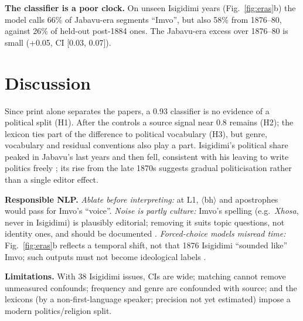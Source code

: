 \documentclass[10pt,letterpaper]{article}
\newcommand{\grapheme}[1]{$\langle$#1$\rangle$}
\begin{document}
 \textbf{The classifier is a poor clock.} On unseen Isigidimi years (Fig.~\ref{fig:eras}b) the model calls 66\% of Jabavu-era segments ``Imvo'', but also 58\% from 1876--80, against 26\% of held-out post-1884 ones. The Jabavu-era excess over 1876--80 is small (+0.05, CI [0.03, 0.07]).


\section{Discussion}\label{Discussion}
Since print alone separates the papers, a 0.93 classifier is no evidence of a political split (H1). After the controls a source signal near 0.8 remains (H2); the lexicon ties part of the difference to political vocabulary (H3), but genre, vocabulary and residual conventions also play a part. Isigidimi's political share peaked in Jabavu's last years and then fell, consistent with his leaving to write politics freely \citep{odendaal1984vukani}; its rise from the late 1870s suggests gradual politicisation rather than a single editor effect.

 \textbf{Responsible NLP.} \emph{Ablate before interpreting:} at L1, \grapheme{bh} and apostrophes would pass for Imvo's ``voice''. \emph{Noise is partly culture:} Imvo's spelling (e.g.\ \emph{Xhosa}, never in Isigidimi) is plausibly editorial; removing it suits topic questions, not identity ones, and should be documented \citep{bender2018data}. \emph{Forced-choice models misread time:} Fig.~\ref{fig:eras}b reflects a temporal shift, not that 1876 Isigidimi ``sounded like'' Imvo; such outputs must not become ideological labels \citep{blodgett2020language}.

 \textbf{Limitations.} With 38 Isigidimi issues, CIs are wide; matching cannot remove unmeasured confounds; frequency and genre are confounded with source; and the lexicons (by a non-first-language speaker; precision not yet estimated) impose a modern politics/religion split.

\end{document}
